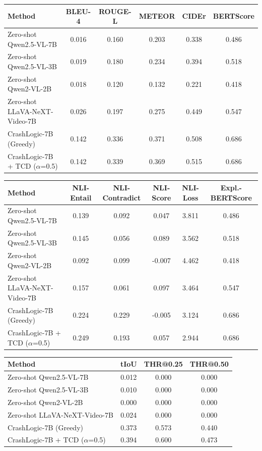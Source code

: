\begin{tabular}{lccccc}
\toprule
Method & BLEU-4 & ROUGE-L & METEOR & CIDEr & BERTScore \\
\midrule
Zero-shot Qwen2.5-VL-7B & 0.016 & 0.160 & 0.203 & 0.338 & 0.486 \\
Zero-shot Qwen2.5-VL-3B & 0.019 & 0.180 & 0.234 & 0.394 & 0.518 \\
Zero-shot Qwen2-VL-2B & 0.018 & 0.120 & 0.132 & 0.221 & 0.418 \\
Zero-shot LLaVA-NeXT-Video-7B & 0.026 & 0.197 & 0.275 & 0.449 & 0.547 \\
CrashLogic-7B (Greedy) & 0.142 & 0.336 & 0.371 & 0.508 & 0.686 \\
CrashLogic-7B + TCD ($\alpha$=0.5) & 0.142 & 0.339 & 0.369 & 0.515 & 0.686 \\
\bottomrule
\end{tabular}


\begin{tabular}{lccccc}
\toprule
Method & NLI-Entail & NLI-Contradict & NLI-Score & NLI-Loss & Expl.-BERTScore \\
\midrule
Zero-shot Qwen2.5-VL-7B & 0.139 & 0.092 & 0.047 & 3.811 & 0.486 \\
Zero-shot Qwen2.5-VL-3B & 0.145 & 0.056 & 0.089 & 3.562 & 0.518 \\
Zero-shot Qwen2-VL-2B & 0.092 & 0.099 & -0.007 & 4.462 & 0.418 \\
Zero-shot LLaVA-NeXT-Video-7B & 0.157 & 0.061 & 0.097 & 3.464 & 0.547 \\
CrashLogic-7B (Greedy) & 0.224 & 0.229 & -0.005 & 3.124 & 0.686 \\
CrashLogic-7B + TCD ($\alpha$=0.5) & 0.249 & 0.193 & 0.057 & 2.944 & 0.686 \\
\bottomrule
\end{tabular}


\begin{tabular}{lccc}
\toprule
Method & tIoU & THR@0.25 & THR@0.50 \\
\midrule
Zero-shot Qwen2.5-VL-7B & 0.012 & 0.000 & 0.000 \\
Zero-shot Qwen2.5-VL-3B & 0.010 & 0.000 & 0.000 \\
Zero-shot Qwen2-VL-2B & 0.000 & 0.000 & 0.000 \\
Zero-shot LLaVA-NeXT-Video-7B & 0.024 & 0.000 & 0.000 \\
CrashLogic-7B (Greedy) & 0.373 & 0.573 & 0.440 \\
CrashLogic-7B + TCD ($\alpha$=0.5) & 0.394 & 0.600 & 0.473 \\
\bottomrule
\end{tabular}


